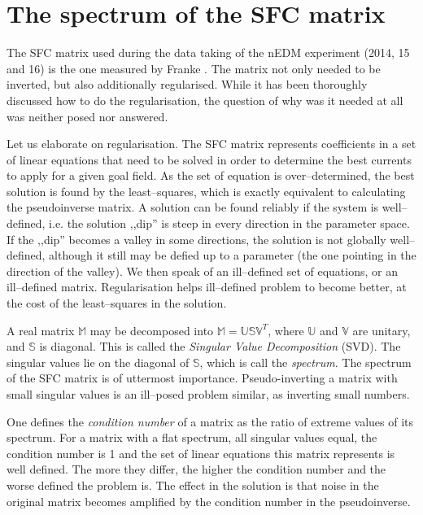 \section{The spectrum of the SFC matrix}
\label{sec:nedm_sfc_matrix}
The SFC matrix used during the data taking of the nEDM experiment (2014, 15 and 16) is the one measured by Franke \cite{Franke2013}. The matrix not only needed to be inverted, but also additionally regularised. While it has been thoroughly discussed how to do the regularisation, the question of why was it needed at all was neither posed nor answered.

Let us elaborate on regularisation. The SFC matrix represents coefficients in a set of linear equations that need to be solved in order to determine the best currents to apply for a given goal field. As the set of equation is over--determined, the best solution is found by the least--squares, which is exactly equivalent to calculating the pseudoinverse matrix. A solution can be found reliably if the system is well--defined, i.e. the solution ,,dip'' is steep in every direction in the parameter space. If the ,,dip'' becomes a valley in some directions, the solution is not globally well--defined, although it still may be defied up to a parameter (the one pointing in the direction of the valley). We then speak of an ill--defined set of equations, or an ill--defined matrix. Regularisation helps ill--defined problem to become better, at the cost of the least--squares in the solution.


A real matrix $\mathbb{M}$ may be decomposed into $\mathbb{M} = \mathbb{U} \mathbb{S} \mathbb{V}^T$, where $\mathbb{U}$ and $\mathbb{V}$ are unitary, and $\mathbb{S}$ is diagonal. This is called the \emph{Singular Value Decomposition} (SVD). The singular values lie on the diagonal of $\mathbb{S}$, which is call the \emph{spectrum}. The spectrum of the SFC matrix is of uttermost importance. Pseudo-inverting a matrix with small singular values is an ill--posed problem similar, as inverting small numbers.

One defines the \emph{condition number} of a matrix as the ratio of extreme values of its spectrum. For a matrix with a flat spectrum, all singular values equal, the condition number is 1 and the set of linear equations this matrix represents is well defined. The more they differ, the higher the condition number and the worse defined the problem is. The effect in the solution is that noise in the original matrix becomes amplified by the condition number in the pseudoinverse.

